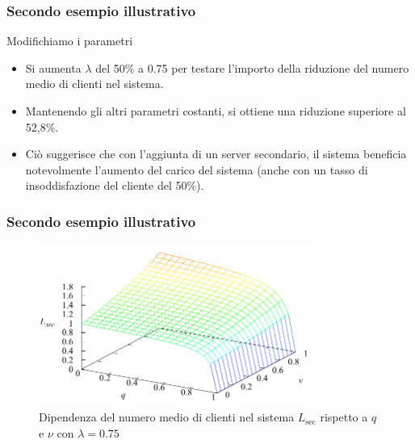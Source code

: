 \documentclass{beamer}
\begin{document}


\begin{frame}
    \frametitle{Secondo esempio illustrativo}
    \begin{block}{Modifichiamo i parametri}
        \begin{itemize}
            \item Si aumenta $\lambda$ del 50\% a 0.75 per testare l'importo della riduzione del numero medio di clienti nel sistema.
            \item Mantenendo gli altri parametri costanti, si ottiene una riduzione superiore al 52,8\%.
            \item Ciò suggerisce che con l'aggiunta di un server secondario, il sistema beneficia notevolmente l'aumento del carico del sistema (anche con un tasso di insoddisfazione del cliente del 50\%).
        \end{itemize}
    \end{block}
\end{frame}


\begin{frame}
    \frametitle{Secondo esempio illustrativo}
    \begin{figure}[h]
        \centering
        \includegraphics[width=0.8\textwidth]{0uFWo7C.png}
        \caption{ Dipendenza del numero medio di clienti nel sistema $L_{\mathrm{sec}}$ rispetto a $q$ e $\nu$ con $\lambda=0.75$}
    \end{figure}
\end{frame}
\end{document}
